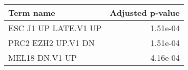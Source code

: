 \begin{tabular}{lr}
\toprule
           Term name &  Adjusted p-value \\
\midrule
ESC J1 UP LATE.V1 UP &          1.51e-04 \\
  PRC2 EZH2 UP.V1 DN &          1.51e-04 \\
      MEL18 DN.V1 UP &          4.16e-04 \\
\bottomrule
\end{tabular}
